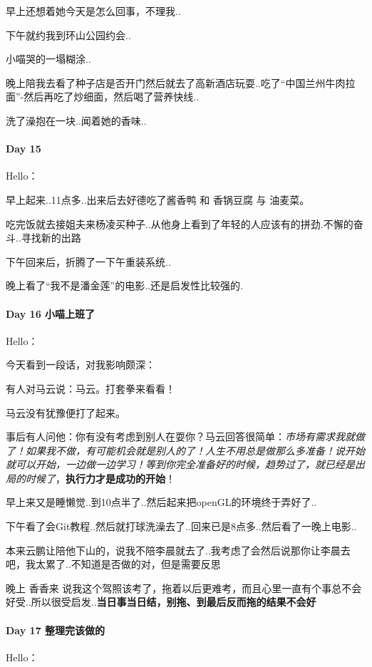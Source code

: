 \documentclass[UTF8,a4paper,8pt]{ctexart}
\begin{document}
		  早上还想着她今天是怎么回事，不理我..
		  
		  下午就约我到环山公园约会..
		  
		  小喵哭的一塌糊涂..
		  
		  晚上陪我去看了种子店是否开门然后就去了高新酒店玩耍..吃了“中国兰州牛肉拉面”-然后再吃了炒细面，然后喝了营养快线..
		  
		  洗了澡抱在一块..闻着她的香味..
		  
 	 \paragraph{Day 15      \quad     }Hello：
	 	 
	 	 早上起来..11点多..出来后去好德吃了酱香鸭 和 香锅豆腐 与 油麦菜。
	 	 
	 	 吃完饭就去接姐夫来杨凌买种子..从他身上看到了年轻的人应该有的拼劲.不懈的奋斗..寻找新的出路
	 	 
	 	 下午回来后，折腾了一下午重装系统..
	 	 
	 	 晚上看了“我不是潘金莲”的电影..还是启发性比较强的.
 	 \paragraph{Day 16  小喵上班了   \quad     }Hello：
 	 
	 	 今天看到一段话，对我影响颇深：
	 	 
	 	 有人对马云说：马云。打套拳来看看！
	 	 
	 	 马云没有犹豫便打了起来。
	 	 
	 	 事后有人问他：你有没有考虑到别人在耍你？马云回答很简单：\textit{市场有需求我就做了！如果我不做，有可能机会就是别人的了！人生不用总是做那么多准备！说开始就可以开始，一边做一边学习！等到你完全准备好的时候，趋势过了，就已经是出局的时候了}，\textbf{执行力才是成功的开始}！
	 	 
	 	 早上来又是睡懒觉..到10点半了..然后起来把openGL的环境终于弄好了..
	 	 
	 	 下午看了会Git教程..然后就打球洗澡去了..回来已是8点多..然后看了一晚上电影..
	 	 
	 	 本来云鹏让陪他下山的，说我不陪李晨就去了..我考虑了会然后说那你让李晨去吧，我太累了..不知道是否做的对，但是需要反思
	 	 
	 	 晚上 香香来 说我这个驾照该考了，拖着以后更难考，而且心里一直有个事总不会好受..所以很受启发..\textbf{当日事当日结，别拖、到最后反而拖的结果不会好}
 	 \paragraph{Day 17  整理完该做的    \quad     }
	 	 Hello：
	 	 
\end{document}
